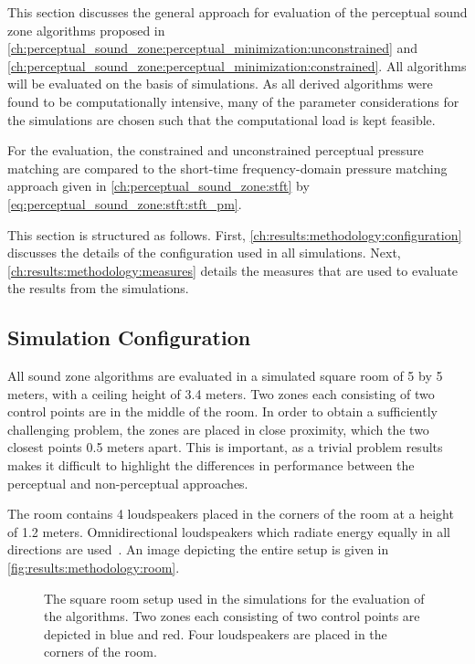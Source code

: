 This section discusses the general approach for evaluation of the perceptual sound zone algorithms proposed in 
\autoref{ch:perceptual_sound_zone:perceptual_minimization:unconstrained} and \autoref{ch:perceptual_sound_zone:perceptual_minimization:constrained}.
All algorithms will be evaluated on the basis of simulations. 
As all derived algorithms were found to be computationally intensive, many of the parameter considerations 
for the simulations are chosen such that the computational load is kept feasible.

For the evaluation, the constrained and unconstrained perceptual pressure matching are compared to the 
short-time frequency-domain pressure matching approach
given in \autoref{ch:perceptual_sound_zone:stft} by \autoref{eq:perceptual_sound_zone:stft:stft_pm}.

This section is structured as follows.
First, \autoref{ch:results:methodology:configuration} discusses the details of the configuration used in all simulations.
Next, \autoref{ch:results:methodology:measures} details the measures that are used to evaluate the results from the 
simulations.

\subsection{Simulation Configuration}
\label{ch:results:methodology:configuration}
All sound zone algorithms are evaluated in a simulated square room of 5 by 5 meters, with a ceiling height of 3.4 meters.
Two zones each consisting of two control points are in the middle of the room.
In order to obtain a sufficiently challenging problem, the zones are placed in close proximity, 
which the two closest points 0.5 meters apart.
This is important, as a trivial problem results makes it difficult to highlight the differences in performance
between the perceptual and non-perceptual approaches.

The room contains 4 loudspeakers placed in the corners of the room at a height of 1.2 meters.
Omnidirectional loudspeakers which radiate energy equally in all directions are used~\cite{habets2006room}.
An image depicting the entire setup is given in \autoref{fig:results:methodology:room}.

\begin{figure}[]
    \centering
    \scalebox{1.0}{}
    \caption{The square room setup used in the simulations for the evaluation of the algorithms.
    Two zones each consisting of two control points are depicted in blue and red. 
    Four loudspeakers are placed in the corners of the room.}
    \label{fig:results:methodology:room}
\end{figure}

